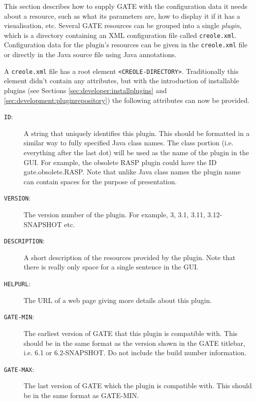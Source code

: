 
This section describes how to supply GATE with the configuration data it needs
about a resource, such as what its parameters are, how to display it if it has
a visualisation, etc.  Several GATE resources can be grouped into a single
\emph{plugin}, which is a directory containing an XML configuration file called
{\tt creole.xml}.  Configuration data for the plugin's resources can be given
in the {\tt creole.xml} file or directly in the Java source file using Java
annotations.

A {\tt creole.xml} file has a root element \verb|<CREOLE-DIRECTORY>|. Traditionally
this element didn't contain any attributes, but with the introduction of installable
plugins (see Sections \ref{sec:developer:installplugins} and
\ref{sec:development:pluginrepository}) the following attributes can now be provided.

\begin{description}
\item[{\tt ID}:] A string that uniquely identifies this plugin. This should
be formatted in a similar way to fully specified Java class names. The class portion
(i.e. everything after the last dot) will be used as the name of the plugin in the
GUI. For example, the obsolete RASP plugin could have the ID gate.obsolete.RASP.
Note that unlike Java class names the plugin name can contain spaces for the purpose
of presentation.
\item[{\tt VERSION}:] The version number of the plugin. For example, 3, 3.1,
3.11, 3.12-SNAPSHOT etc.
\item[{\tt DESCRIPTION}:] A short description of the resources provided by the plugin.
Note that there is really only space for a single sentence in the GUI.
\item[{\tt HELPURL}:] The URL of a web page giving more details about this plugin.
\item[{\tt GATE-MIN}:] The  earliest version of GATE that this plugin is compatible
with. This should be in the same format as the version shown in the GATE titlebar, i.e.
6.1 or 6.2-SNAPSHOT. Do not include the build number information.
\item[{\tt GATE-MAX}:] The last version of GATE which the plugin is compatible with.
This should be in the same format as GATE-MIN.
\end{description}

